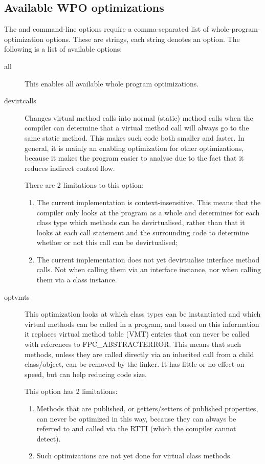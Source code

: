 \subsection{Available WPO optimizations}
The  and  command-line options require a comma-separated list of
whole-program-optimization options. These are strings, each string denotes
an option. The following is a list of available options:
\begin{description}
\item[all] This enables all available whole program optimizations.

\item[devirtcalls] Changes virtual method calls into normal (static) method
calls when the compiler can determine that a virtual method call will always
go to the same static method. This makes such code both smaller and faster.
In general, it is mainly an enabling optimization for other optimizations,
because it makes the program easier to analyse due to the fact that it reduces
indirect control flow. 

There are 2 limitations to this option:
\begin{enumerate}
\item The current implementation is context-insensitive. This means that the
compiler only looks at the program as a whole and determines for each class
type which methods can be devirtualised, rather than that it looks at each
call statement and the surrounding code to determine whether or not this
call can be devirtualised; 
\item The current implementation does not yet devirtualise interface method
calls. Not when calling them via an interface instance, nor when calling 
them via a class instance.
\end{enumerate}

\item[optvmts]
This optimization looks at which class types can be instantiated and which
virtual methods can be called in a program, and based on this information it
replaces virtual method table (VMT) entries that can never be called with
references to FPC\_ABSTRACTERROR. This means that such methods, unless they
are called directly via an inherited call from a child class/object, can be
removed by the linker. It has little or no effect on speed, but can help
reducing code size. 

This option has 2 limitations:
\begin{enumerate}
\item Methods that are published, or getters/setters of published properties, can
never be optimized in this way, because they can always be referred to and
called via the RTTI (which the compiler cannot detect). 
\item Such optimizations are not yet done for virtual class methods.
\end{enumerate}


\end{description}
